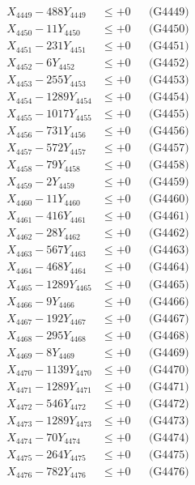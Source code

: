 \documentclass[a4paper,10pt]{article}
\begin{document}
{\begin{align}
X_{4449} - 488Y_{4449} &\leq +0 && \text{(G4449)} \\
X_{4450} - 11Y_{4450} &\leq +0 && \text{(G4450)} \\
\allowbreak
X_{4451} - 231Y_{4451} &\leq +0 && \text{(G4451)} \\
X_{4452} - 6Y_{4452} &\leq +0 && \text{(G4452)} \\
X_{4453} - 255Y_{4453} &\leq +0 && \text{(G4453)} \\
X_{4454} - 1289Y_{4454} &\leq +0 && \text{(G4454)} \\
X_{4455} - 1017Y_{4455} &\leq +0 && \text{(G4455)} \\
X_{4456} - 731Y_{4456} &\leq +0 && \text{(G4456)} \\
X_{4457} - 572Y_{4457} &\leq +0 && \text{(G4457)} \\
X_{4458} - 79Y_{4458} &\leq +0 && \text{(G4458)} \\
X_{4459} - 2Y_{4459} &\leq +0 && \text{(G4459)} \\
X_{4460} - 11Y_{4460} &\leq +0 && \text{(G4460)} \\
\allowbreak
X_{4461} - 416Y_{4461} &\leq +0 && \text{(G4461)} \\
X_{4462} - 28Y_{4462} &\leq +0 && \text{(G4462)} \\
X_{4463} - 567Y_{4463} &\leq +0 && \text{(G4463)} \\
X_{4464} - 468Y_{4464} &\leq +0 && \text{(G4464)} \\
X_{4465} - 1289Y_{4465} &\leq +0 && \text{(G4465)} \\
X_{4466} - 9Y_{4466} &\leq +0 && \text{(G4466)} \\
X_{4467} - 192Y_{4467} &\leq +0 && \text{(G4467)} \\
X_{4468} - 295Y_{4468} &\leq +0 && \text{(G4468)} \\
X_{4469} - 8Y_{4469} &\leq +0 && \text{(G4469)} \\
X_{4470} - 1139Y_{4470} &\leq +0 && \text{(G4470)} \\
\allowbreak
X_{4471} - 1289Y_{4471} &\leq +0 && \text{(G4471)} \\
X_{4472} - 546Y_{4472} &\leq +0 && \text{(G4472)} \\
X_{4473} - 1289Y_{4473} &\leq +0 && \text{(G4473)} \\
X_{4474} - 70Y_{4474} &\leq +0 && \text{(G4474)} \\
X_{4475} - 264Y_{4475} &\leq +0 && \text{(G4475)} \\
X_{4476} - 782Y_{4476} &\leq +0 && \text{(G4476)} \\

\end{align}}
\end{document}
